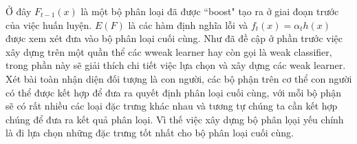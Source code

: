 \documentclass[12pt,a4paper]{article}
\newcounter{subsubsubsection}[subsubsection]
\begin{document}
Ở đây $F_{t-1}(x)$ là một bộ phân loại đã được “boost" tạo ra ở giai đoạn trước của việc huấn luyện. $E(F)$ là các hàm định nghĩa lỗi và $f_{t}(x) = \alpha_{t}h(x)$ được xem xét đưa vào bộ phân loại cuối cùng.
Như đã đề cập ở phần trước việc xây dựng trên một quần thể các wweak learner hay còn gọi là weak classifier, trong phần này sẽ giải thích chi tiết việc lựa chọn và xây dựng các weak learner. Xét bài toàn nhận diện đối tượng là con người, các bộ phận trên cơ thể con người có thể được kết hợp để đưa ra quyết định phân loại cuối cùng, với mỗi bộ phận sẽ có rất nhiều các loại đặc trưng khác nhau và tương tự chúng ta cần kết hợp chúng để đưa ra kết quả phân loại. Vì
thế việc xây dựng bộ phân lọại yếu chính là đi lựa chọn những đặc trưng tốt nhất cho bộ phân loại cuối cùng.
\end{document}
